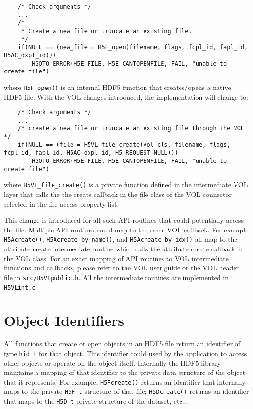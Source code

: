 \begin{lstlisting}
    /* Check arguments */
    ...
    /*                                                                                                                                                                                                                                       
     * Create a new file or truncate an existing file.                                                                                                                                                                                       
     */
    if(NULL == (new_file = H5F_open(filename, flags, fcpl_id, fapl_id, H5AC_dxpl_id)))
        HGOTO_ERROR(H5E_FILE, H5E_CANTOPENFILE, FAIL, "unable to create file")
\end{lstlisting}

where {\tt H5F\_open()} is an internal HDF5 function that creates/opens a native HDF5 file. With the VOL changes introduced, the implementation will change to:

\begin{lstlisting}
    /* Check arguments */
    ...
    /* create a new file or truncate an existing file through the VOL */
    if(NULL == (file = H5VL_file_create(vol_cls, filename, flags, fcpl_id, fapl_id, H5AC_dxpl_id, H5_REQUEST_NULL)))
        HGOTO_ERROR(H5E_FILE, H5E_CANTOPENFILE, FAIL, "unable to create file")
\end{lstlisting}

where {\tt H5VL\_file\_create()} is a private function defined in the intermediate VOL layer that calls the the create callback in the file class of the VOL connector selected in the file access property list.

This change is introduced for all such API routines that could potentially access the file. Multiple API routines could map to the same VOL callback. For example {\tt H5Acreate()}, {\tt H5Acreate\_by\_name()}, and {\tt H5Acreate\_by\_idx()} all map to the attribute create intermediate routine which calls the attribute create callback in the VOL class. For an exact mapping of API routines to VOL intermediate functions and callbacks, please refer to the VOL user guide or the VOL header file in {\tt src/H5VLpublic.h}. All the intermediate routines are implemented in {\tt H5VLint.c}.

\section{Object Identifiers}
All functions that create or open objects in an HDF5 file return an identifier of type {\tt hid\_t} for that object. This identifier could used by the application to access other objects or operate on the object itself. Internally the HDF5 library maintains a mapping of that identifier to the private data structure of the object that it represents. For example, {\tt H5Fcreate()} returns an identifier that internally maps to the private {\tt H5F\_t} structure of that file; {\tt H5Dcreate()} returns an identifier that maps to the {\tt H5D\_t} private structure of the dataset, etc... 

